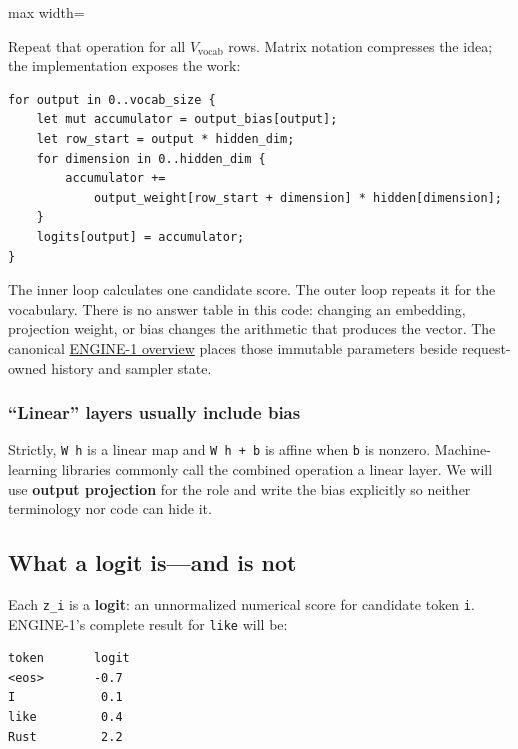 \documentclass[
  10pt,
]{article}
\begin{document}
\begin{center}\begin{adjustbox}{max width=\linewidth}\end{adjustbox}\end{center}

Repeat that operation for all \(V_{\mathrm{vocab}}\) rows. Matrix
notation compresses the idea; the implementation exposes the work:

\begin{verbatim}
for output in 0..vocab_size {
    let mut accumulator = output_bias[output];
    let row_start = output * hidden_dim;
    for dimension in 0..hidden_dim {
        accumulator +=
            output_weight[row_start + dimension] * hidden[dimension];
    }
    logits[output] = accumulator;
}
\end{verbatim}

The inner loop calculates one candidate score. The outer loop repeats it
for the vocabulary. There is no answer table in this code: changing an
embedding, projection weight, or bias changes the arithmetic that
produces the vector. The canonical
\href{https://github.com/hermonai/inside-the-llm-engine/blob/astra-visual-rewrite/diagrams/model/engine-1-overview.txt}{ENGINE-1
overview} places those immutable parameters beside request-owned history
and sampler state.

\subsubsection{``Linear'' layers usually include
bias}\label{linear-layers-usually-include-bias}

Strictly, \texttt{W\ h} is a linear map and \texttt{W\ h\ +\ b} is
affine when \texttt{b} is nonzero. Machine-learning libraries commonly
call the combined operation a linear layer. We will use \textbf{output
projection} for the role and write the bias explicitly so neither
terminology nor code can hide it.

\subsection{What a logit is---and is
not}\label{what-a-logit-isand-is-not}

Each \texttt{z\_i} is a \textbf{logit}: an unnormalized numerical score
for candidate token \texttt{i}. ENGINE-1's complete result for
\texttt{like} will be:

\begin{verbatim}
token       logit
<eos>       -0.7
I            0.1
like         0.4
Rust         2.2
\end{verbatim}
\end{document}
